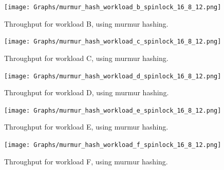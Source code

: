 \documentclass[11pt]{report} %
\begin{document}
\begin{figure}[H]
  \centering
  \texttt{[image: Graphs/murmur\_hash\_workload\_b\_spinlock\_16\_8\_12.png]}\\
  \caption[]{Throughput for workload B, using murmur hashing.}\label{fig:mur_b_full}
\end{figure}
\begin{figure}[H]
  \centering
  \texttt{[image: Graphs/murmur\_hash\_workload\_c\_spinlock\_16\_8\_12.png]}\\
  \caption[]{Throughput for workload C, using murmur hashing.}\label{fig:mur_c_full}
\end{figure}
\begin{figure}[H]
  \centering
  \texttt{[image: Graphs/murmur\_hash\_workload\_d\_spinlock\_16\_8\_12.png]}\\
  \caption[]{Throughput for workload D, using murmur hashing.}\label{fig:mur_d_full}
\end{figure}
\begin{figure}[H]
  \centering
  \texttt{[image: Graphs/murmur\_hash\_workload\_e\_spinlock\_16\_8\_12.png]}\\
  \caption[]{Throughput for workload E, using murmur hashing.}\label{fig:mur_e_full}
\end{figure}
\begin{figure}[H]
  \centering
  \texttt{[image: Graphs/murmur\_hash\_workload\_f\_spinlock\_16\_8\_12.png]}\\
  \caption[]{Throughput for workload F, using murmur hashing.}\label{fig:mur_f_full}
\end{figure}
\end{document}
